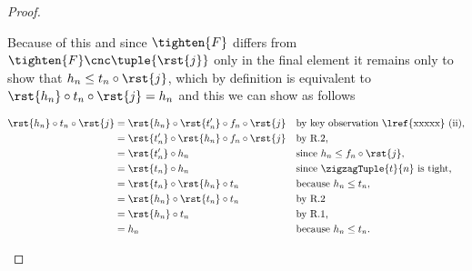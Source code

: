 \begin{proof}
\begin{enumerate}[(i)]
Because of this and since $\tighten{F}$ differs from
$\tighten{F} \cnc \tuple{\rst{j}}$
only in the final element it remains only to show that
$h_n \leq t_n \circ \rst{j}$, which by definition
is equivalent to
$\rst{h_n} \circ t_n \circ \rst{j} =h_n$
and this we can show as follows

\begin{align*}
\rst{h_n} \circ t_n \circ \rst{j} 
  &= \rst{h_n} \circ \rst{t'_n} \circ f_n \circ \rst{j} 
      && \mbox{by key observation \lref{xxxxx} (ii),}\\
  &= \rst{t'_n} \circ \rst{h_n} \circ f_n \circ \rst{j}
      && \mbox{by R.2,}\\
  &= \rst{t'_n} \circ h_n
      && \mbox{since $h_n \leq f_n \circ \rst{j}$,}\\
  &= \rst{t_n} \circ h_n
      && \mbox{since $\zigzagTuple{t}{n}$ is tight,}\\
  &= \rst{t_n} \circ \rst{h_n} \circ t_n
      && \mbox{because $h_n \leq t_n$,}\\
  &= \rst{h_n} \circ \rst{t_n} \circ t_n
      && \mbox{by R.2} \\
  &= \rst{h_n} \circ t_n
      && \mbox{by R.1,} \\
  &= h_n
      && \mbox{because $h_n \leq t_n$.}
\end{align*}
\end{enumerate}
\end{proof}
